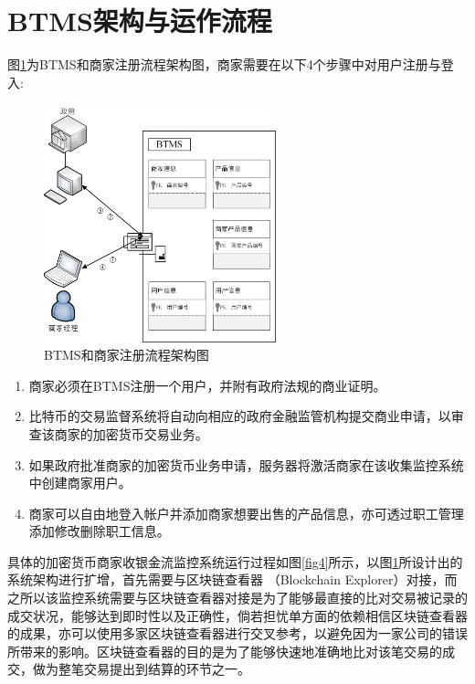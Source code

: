\section{BTMS架构与运作流程}

	图\ref{fig3}为BTMS和商家注册流程架构图，商家需要在以下4个步骤中对用户注册与登入:

	\begin{figure}[!htbp]
		\centering
		\includegraphics[width = 0.6\textwidth]{fig3.jpg}
		\caption{BTMS和商家注册流程架构图}\label{fig3}
	\end{figure}

	\begin{enumerate}
		\item 商家必须在BTMS注册一个用户，并附有政府法规的商业证明。
		\item 比特币的交易监督系统将自动向相应的政府金融监管机构提交商业申请，以审查该商家的加密货币交易业务。
		\item 如果政府批准商家的加密货币业务申请，服务器将激活商家在该收集监控系统中创建商家用户。
		\item 商家可以自由地登入帐户并添加商家想要出售的产品信息，亦可透过职工管理添加修改删除职工信息。
	\end{enumerate}

	具体的加密货币商家收银金流监控系统运行过程如图\ref{fig4}所示，以图\ref{fig3}所设计出的系统架构进行扩增，首先需要与区块链查看器 （Blockchain Explorer）\supercite{Blockchainexplorer:Ananalyticalprocessandinvestigationenvironmentforbitcoin}对接，而之所以该监控系统需要与区块链查看器对接是为了能够最直接的比对交易被记录的成交状况，能够达到即时性以及正确性，倘若担忧单方面的依赖相信区块链查看器的成果，亦可以使用多家区块链查看器进行交叉参考，以避免因为一家公司的错误所带来的影响。区块链查看器的目的是为了能够快速地准确地比对该笔交易的成交，做为整笔交易提出到结算的环节之一。


